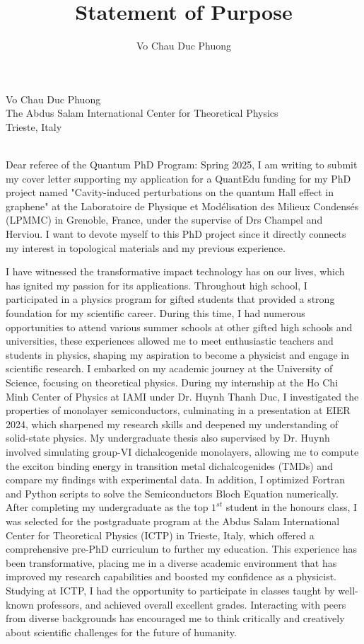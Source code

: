 \documentclass[a4paper]{article}
\title{Statement of Purpose}
\author{Vo Chau Duc Phuong}
\begin{document}
	\parbox{0.5\textwidth}{Vo Chau Duc Phuong\\
		The Abdus Salam International Center for Theoretical Physics\\
		Trieste, Italy}
	\vspace{0.5cm}\\\null
	\quad Dear referee of the Quantum PhD Program: Spring 2025, I am writing to submit my cover letter supporting my application for a QuantEdu funding for my PhD project named "Cavity-induced perturbations on the quantum Hall effect in graphene" at the Laboratoire de Physique et Modélisation des Milieux Condensés (LPMMC) in Grenoble, France, under the supervise of Drs Champel and Herviou. I want to devote myself to this PhD project since it directly connects my interest in topological materials and my previous experience.\\\null\quad 
	
	  I have witnessed the transformative impact technology has on our lives, which has ignited my passion for its applications. Throughout high school, I participated in a physics program for gifted students that provided a strong foundation for my scientific career. During this time, I had numerous opportunities to attend various summer schools at other gifted high schools and universities, these experiences allowed me to meet enthusiastic teachers and students in physics, shaping my aspiration to become a physicist and engage in scientific research. I embarked on my academic journey at the University of Science, focusing on theoretical physics. During my internship at the Ho Chi Minh Center of Physics at IAMI under Dr. Huynh Thanh Duc, I investigated the properties of monolayer semiconductors, culminating in a presentation at EIER 2024, which sharpened my research skills and deepened my understanding of solid-state physics. My undergraduate thesis also supervised by Dr. Huynh involved simulating group-VI dichalcogenide monolayers, allowing me to compute the exciton binding energy in transition metal dichalcogenides (TMDs) and compare my findings with experimental data. In addition, I optimized Fortran and Python scripts to solve the Semiconductors Bloch Equation numerically. After completing my undergraduate as the top \(1^{st}\) student in the honours class, I was selected for the postgraduate program at the Abdus Salam International Center for Theoretical Physics (ICTP) in Trieste, Italy, which offered a comprehensive pre-PhD curriculum to further my education. This experience has been transformative, placing me in a diverse academic environment that has improved my research capabilities and boosted my confidence as a physicist. Studying at ICTP, I had the opportunity to participate in classes taught by well-known professors, and achieved overall excellent grades. Interacting with peers from diverse backgrounds has encouraged me to think critically and creatively about scientific challenges for the future of humanity.\\\null\quad
	
\end{document}

